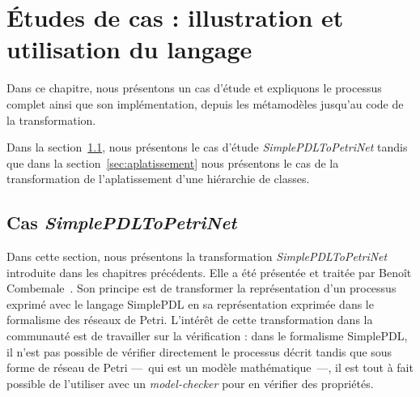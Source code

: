 \chapter{Études de cas : illustration et utilisation du langage}
\label{ch:usecase}



Dans ce chapitre, nous présentons un cas d'étude et expliquons le processus
complet ainsi que son implémentation, depuis les métamodèles jusqu'au code
de la transformation.

Dans la section~\ref{sec:simplepdl2pn}, nous présentons le cas d'étude
\emph{SimplePDLToPetriNet} tandis que dans la section~\ref{sec:aplatissement}
nous présentons le cas de la transformation de l'aplatissement d'une hiérarchie
de classes.

\section{Cas \emph{SimplePDLToPetriNet}}
\label{sec:simplepdl2pn}


Dans cette section, nous présentons la transformation
\emph{SimplePDLToPetriNet} introduite dans les chapitres précédents. Elle a été
présentée et traitée par Benoît Combemale~\cite{combemale08}. Son principe est de
transformer la représentation d'un processus exprimé avec le langage SimplePDL
en sa représentation exprimée dans le formalisme des réseaux de Petri.
L'intérêt de cette transformation dans la communauté est de travailler sur la
vérification : dans le formalisme SimplePDL, il n'est pas possible de vérifier
directement le processus décrit tandis que sous forme de réseau de Petri
---~qui est un modèle mathématique~---, il est tout à fait possible de
l'utiliser avec un \emph{model-checker} pour en vérifier des propriétés.

